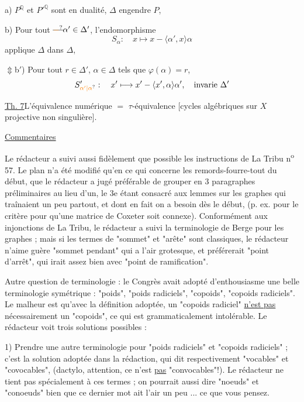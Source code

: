{a) \quad $P^{\mathbb Q}$ et $P'^{\mathbb Q}$ sont en dualité, $\Delta$ engendre $P$, 

b) \quad Pour tout $\deleted{\unsure{-}}\alpha'\in\Delta'$,  l'endomorphisme
\[
S_{\alpha}:\quad x\longmapsto x-\langle\alpha',x\rangle\alpha
\]
applique $\Delta$ dans $\Delta$, 

\noindent$\Updownarrow$\qquad b$'$) Pour tout $r\in\Delta'$, $\alpha\in\Delta$ tels que $\varphi(\alpha)=r$,
\[
S'_{\unsure{\alpha'|\alpha}}:\quad x'\longmapsto x'-\langle x',\alpha\rangle\alpha',\quad\text{invarie }\Delta'
\]}
\uline{Th. 7}\qquad L'équivalence numérique $=$ $\tau$-équivalence \deleted{(}[cycles algébriques sur $X$ projective non singulière\deleted{)}].
\begin{center}\uline{Commentaires}\end{center}

Le rédacteur a suivi aussi fidèlement que possible les instructions de La Tribu n\textsuperscript{o} 57. Le plan n'a été modifié qu'en ce qui concerne les remords-fourre-tout du début, que le rédacteur a jugé préférable de grouper en 3 paragraphes préliminaires au lieu d'un, le 3e étant consacré aux lemmes sur les graphes qui traînaient un peu partout, et dont en fait on a besoin dès le début, (p. ex. pour le critère pour qu'une matrice de Coxeter soit connexe). Conformément aux injonctions de La Tribu, le rédacteur a suivi la terminologie de Berge pour les graphes ; mais si les termes de "sommet" et "arête" sont classiques, le rédacteur n'aime guère "sommet pendant" qui a l'air grotesque, et préférerait "point d'arrêt", qui irait assez bien avec "point de ramification".

Autre question de terminologie : le Congrès avait adopté d'enthousiasme une belle terminologie symétrique : "poids", "poids radiciels", "copoids", "copoids radiciels". Le malheur est qu'avec la définition adoptée, un "copoids radiciel" \uline{n'est pas} nécessairement un "copoids", ce qui est grammaticalement intolérable. Le rédacteur voit trois solutions possibles :

1) Prendre une autre terminologie pour "poids radiciels" et "copoids radiciels" ; c'est la solution adoptée dans la rédaction, qui dit respectivement "vocables" et "covocables", (dactylo, attention, ce n'est \uline{pas} "convocables"!). Le rédacteur ne tient pas spécialement à ces termes ; on pourrait aussi dire "noeuds" et "conoeuds" bien que ce dernier mot ait l'air un peu ... ce que vous pensez.

